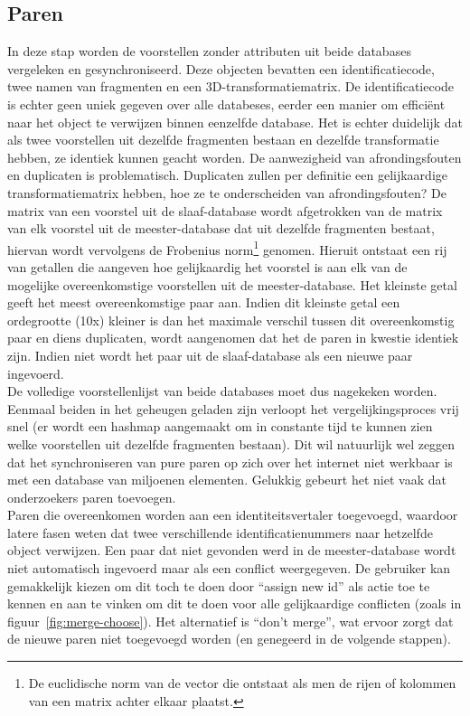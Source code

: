 \subsection{Paren}
In deze stap worden de voorstellen zonder attributen uit beide databases vergeleken en gesynchroniseerd. Deze objecten bevatten een identificatiecode, twee namen van fragmenten en een 3D-transformatiematrix. De identificatiecode is echter geen uniek gegeven over alle databeses, eerder een manier om effici\"ent naar het object te verwijzen binnen eenzelfde database. Het is echter duidelijk dat als twee voorstellen uit dezelfde fragmenten bestaan en dezelfde transformatie hebben, ze identiek kunnen geacht worden. De aanwezigheid van afrondingsfouten en duplicaten is problematisch. Duplicaten zullen per definitie een gelijkaardige transformatiematrix hebben, hoe ze te onderscheiden van afrondingsfouten? De matrix van een voorstel uit de slaaf-database wordt afgetrokken van de matrix van elk voorstel uit de meester-database dat uit dezelfde fragmenten bestaat, hiervan wordt vervolgens de Frobenius norm\footnote{De euclidische norm van de vector die ontstaat als men de rijen of kolommen van een matrix achter elkaar plaatst.} genomen. Hieruit ontstaat een rij van getallen die aangeven hoe gelijkaardig het voorstel is aan elk van de mogelijke overeenkomstige voorstellen uit de meester-database. Het kleinste getal geeft het meest overeenkomstige paar aan. Indien dit kleinste getal een ordegrootte (10x) kleiner is dan het maximale verschil tussen dit overeenkomstig paar en diens duplicaten, wordt aangenomen dat het de paren in kwestie identiek zijn. Indien niet wordt het paar uit de slaaf-database als een nieuwe paar ingevoerd.\\

De volledige voorstellenlijst van beide databases moet dus nagekeken worden. Eenmaal beiden in het geheugen geladen zijn verloopt het vergelijkingsproces vrij snel (er wordt een hashmap aangemaakt om in constante tijd te kunnen zien welke voorstellen uit dezelfde fragmenten bestaan). Dit wil natuurlijk wel zeggen dat het synchroniseren van pure paren op zich over het internet niet werkbaar is met een database van miljoenen elementen. Gelukkig gebeurt het niet vaak dat onderzoekers paren toevoegen.\\

Paren die overeenkomen worden aan een identiteitsvertaler toegevoegd, waardoor latere fasen weten dat twee verschillende identificatienummers naar hetzelfde object verwijzen. Een paar dat niet gevonden werd in de meester-database wordt niet automatisch ingevoerd maar als een conflict weergegeven. De gebruiker kan gemakkelijk kiezen om dit toch te doen door ``assign new id'' als actie toe te kennen en aan te vinken om dit te doen voor alle gelijkaardige conflicten (zoals in figuur~\ref{fig:merge-choose}). Het alternatief is ``don't merge'', wat ervoor zorgt dat de nieuwe paren niet toegevoegd worden (en genegeerd in de volgende stappen).

